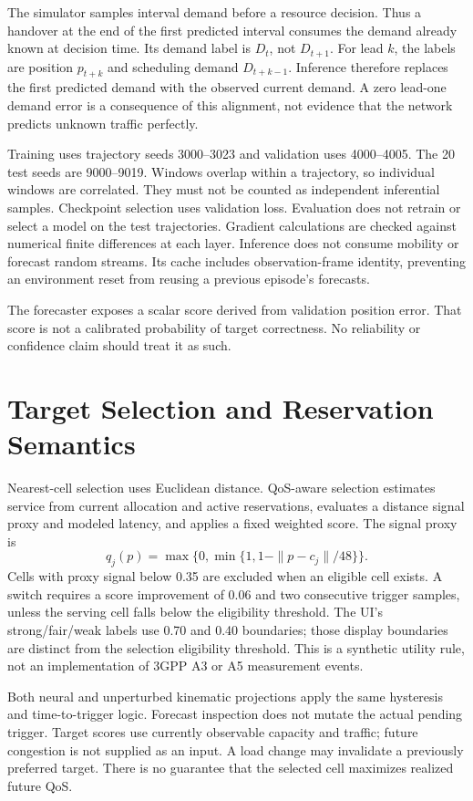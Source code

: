 \documentclass[journal]{IEEEtran}
\begin{document}
The simulator samples interval demand before a resource decision. Thus a handover at the end of the first predicted interval consumes the demand already known at decision time. Its demand label is $D_t$, not $D_{t+1}$. For lead $k$, the labels are position $p_{t+k}$ and scheduling demand $D_{t+k-1}$. Inference therefore replaces the first predicted demand with the observed current demand. A zero lead-one demand error is a consequence of this alignment, not evidence that the network predicts unknown traffic perfectly.

Training uses trajectory seeds 3000--3023 and validation uses 4000--4005. The 20 test seeds are 9000--9019. Windows overlap within a trajectory, so individual windows are correlated. They must not be counted as independent inferential samples. Checkpoint selection uses validation loss. Evaluation does not retrain or select a model on the test trajectories. Gradient calculations are checked against numerical finite differences at each layer. Inference does not consume mobility or forecast random streams. Its cache includes observation-frame identity, preventing an environment reset from reusing a previous episode's forecasts.

The forecaster exposes a scalar score derived from validation position error. That score is not a calibrated probability of target correctness. No reliability or confidence claim should treat it as such.

\section{Target Selection and Reservation Semantics}
Nearest-cell selection uses Euclidean distance. QoS-aware selection estimates service from current allocation and active reservations, evaluates a distance signal proxy and modeled latency, and applies a fixed weighted score. The signal proxy is
\begin{equation}
q_j(p)=\max\{0,\min\{1,1-\|p-c_j\|/48\}\}.
\end{equation}
Cells with proxy signal below 0.35 are excluded when an eligible cell exists. A switch requires a score improvement of 0.06 and two consecutive trigger samples, unless the serving cell falls below the eligibility threshold. The UI's strong/fair/weak labels use 0.70 and 0.40 boundaries; those display boundaries are distinct from the selection eligibility threshold. This is a synthetic utility rule, not an implementation of 3GPP A3 or A5 measurement events.

Both neural and unperturbed kinematic projections apply the same hysteresis and time-to-trigger logic. Forecast inspection does not mutate the actual pending trigger. Target scores use currently observable capacity and traffic; future congestion is not supplied as an input. A load change may invalidate a previously preferred target. There is no guarantee that the selected cell maximizes realized future QoS.
\end{document}
